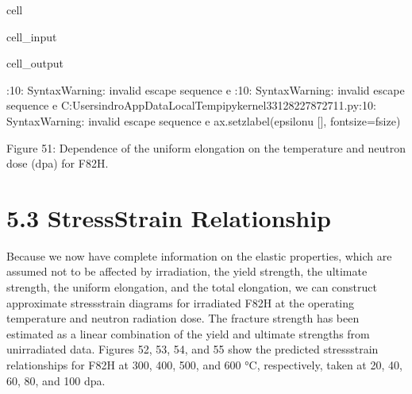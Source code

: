 \documentclass[letterpaper,10pt,english]{jupyterBook}
\begin{document}
\begin{sphinxuseclass}{cell}
\begin{sphinxVerbatimInput}
\begin{sphinxuseclass}{cell_input}
		\end{sphinxuseclass}\end{sphinxVerbatimInput}
		\begin{sphinxVerbatimOutput}
			
			\begin{sphinxuseclass}{cell_output}
				\begin{sphinxVerbatim}[commandchars=\\\{\}]
					\PYGZlt{}\PYGZgt{}:10: SyntaxWarning: invalid escape sequence \PYGZsq{}\PYGZbs{}e\PYGZsq{}
					\PYGZlt{}\PYGZgt{}:10: SyntaxWarning: invalid escape sequence \PYGZsq{}\PYGZbs{}e\PYGZsq{}
					C:\PYGZbs{}Users\PYGZbs{}indro\PYGZbs{}AppData\PYGZbs{}Local\PYGZbs{}Temp\PYGZbs{}ipykernel\PYGZus{}33128\PYGZbs{}227872711.py:10: SyntaxWarning: invalid escape sequence \PYGZsq{}\PYGZbs{}e\PYGZsq{}
					ax.set\PYGZus{}zlabel(\PYGZsq{}\PYGZdl{}\PYGZbs{}epsilon\PYGZus{}\PYGZob{}u\PYGZcb{}\PYGZdl{} [\PYGZpc{}]\PYGZsq{}, fontsize=f\PYGZus{}size)
				\end{sphinxVerbatim}
				
				\noindent{}
				
		\end{sphinxuseclass}\end{sphinxVerbatimOutput}
		
	\end{sphinxuseclass}
	\sphinxAtStartPar
	Figure 51: Dependence of the uniform elongation on the temperature and neutron dose (dpa) for F82H.
	
	
	\section{5.3 Stress\sphinxhyphen{}Strain Relationship}
	\label{\detokenize{5 Radiation Effects on Mechanical Properties:stress-strain-relationship}}
	\sphinxAtStartPar
	Because we now have complete information on the elastic properties, which are assumed not to be affected by irradiation, the yield strength, the ultimate strength, the uniform elongation, and the total elongation, we can construct approximate stress\sphinxhyphen{}strain diagrams for irradiated F82H at the operating temperature and neutron radiation dose.  The fracture strength has been estimated as a linear combination of the yield and ultimate strengths from unirradiated data.  Figures 52, 53, 54, and 55 show the predicted stress\sphinxhyphen{}strain relationships for F82H at 300, 400, 500, and 600 °C, respectively, taken at 20, 40, 60, 80, and 100 dpa.
	
\end{document}
